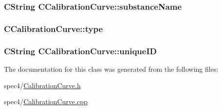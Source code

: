 \hypertarget{classCCalibrationCurve_a4fb073155998e24486464ba870da81c3}{
\subsubsection[{substanceName}]{\setlength{\rightskip}{0pt plus 5cm}CString {\bf CCalibrationCurve::substanceName}}}
\label{classCCalibrationCurve_a4fb073155998e24486464ba870da81c3}
\hypertarget{classCCalibrationCurve_a4bab63d0e43e43415ccd187ae08d511e}{
\subsubsection[{type}]{ {\bf CCalibrationCurve::type}}}
\label{classCCalibrationCurve_a4bab63d0e43e43415ccd187ae08d511e}
\hypertarget{classCCalibrationCurve_a7634cd9a6c79e0e68ecbe4fd5ed480cb}{
\subsubsection[{uniqueID}]{\setlength{\rightskip}{0pt plus 5cm}CString {\bf CCalibrationCurve::uniqueID}}}
\label{classCCalibrationCurve_a7634cd9a6c79e0e68ecbe4fd5ed480cb}


The documentation for this class was generated from the following files:\begin{DoxyCompactItemize}
\item 
spec4/\hyperlink{CalibrationCurve_8h}{CalibrationCurve.h}\item 
spec4/\hyperlink{CalibrationCurve_8cpp}{CalibrationCurve.cpp}\end{DoxyCompactItemize}
